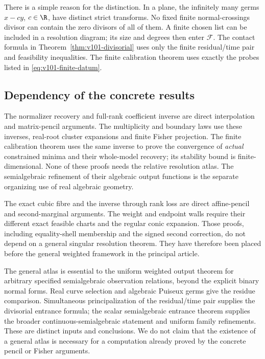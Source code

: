 There is a simple reason for the distinction. In a plane, the infinitely
many germs $x-cy$, $c\in\R$, have distinct strict transforms. No fixed
finite normal-crossings divisor can contain the zero divisors of all
of them. A finite chosen list can be included in a resolution diagram;
its size and degrees then enter $\mathcal F$. The contact formula in
Theorem~\ref{thm:v101-divisorial} uses only the finite residual/time
pair and feasibility inequalities. The finite calibration theorem uses
exactly the probes listed in \eqref{eq:v101-finite-datum}.

\subsection{Dependency of the concrete results}
The normalizer recovery and full-rank coefficient inverse are direct
interpolation and matrix-pencil arguments. The multiplicity and
boundary laws use these inverses, real-root cluster expansions and
finite Fisher projection. The finite calibration theorem uses the same
inverse to prove the convergence of \emph{actual} constrained minima
and their whole-model recovery; its stability bound is finite-dimensional.
None of these proofs needs the relative resolution atlas. The
semialgebraic refinement of their algebraic output functions is the
separate organizing use of real algebraic geometry.

The exact cubic fibre and the inverse through rank loss are direct
affine-pencil and second-marginal arguments. The weight and endpoint
walls require their different exact feasible charts and the regular
conic expansion. Those proofs, including equality-shell membership and
the signed second correction, do not depend on a general singular
resolution theorem. They have therefore been placed before the general
weighted framework in the principal article.

The general atlas is essential to the uniform weighted output theorem
for arbitrary specified semialgebraic observation relations, beyond the
explicit binary normal forms. Real curve selection and algebraic
Puiseux germs give the residue comparison. Simultaneous principalization
of the residual/time pair supplies the divisorial entrance formula;
the scalar semialgebraic entrance theorem supplies the broader
continuous-semialgebraic statement and uniform family refinements.
These are distinct inputs and conclusions. We do not claim that the
existence of a general atlas is necessary for a computation already
proved by the concrete pencil or Fisher arguments.
